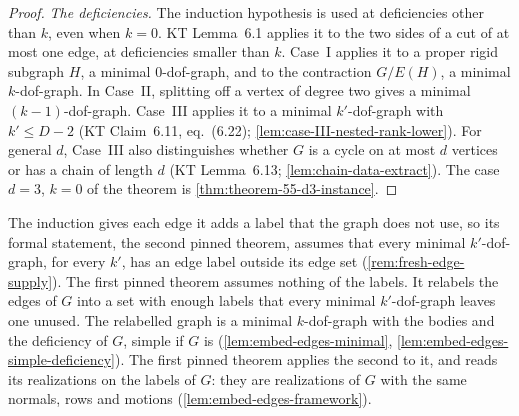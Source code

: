\begin{proof}
  \emph{The deficiencies.} The induction hypothesis is used at
  deficiencies other than $k$, even when $k = 0$. KT Lemma~6.1 applies
  it to the two sides of a cut of at most one edge, at deficiencies
  smaller than $k$. Case~I applies it to a proper rigid subgraph $H$, a
  minimal $0$-dof-graph, and to the contraction $G/E(H)$, a minimal
  $k$-dof-graph. In Case~II, splitting off a vertex of degree two gives a
  minimal $(k-1)$-dof-graph. Case~III applies it to a minimal
  $k'$-dof-graph with $k' \le D - 2$ (KT Claim~6.11, eq.~(6.22);
  \cref{lem:case-III-nested-rank-lower}). For general $d$, Case~III also
  distinguishes whether $G$ is a cycle on at most $d$ vertices or has a
  chain of length $d$ (KT Lemma~6.13; \cref{lem:chain-data-extract}). The
  case $d = 3$, $k = 0$ of the theorem is
  \cref{thm:theorem-55-d3-instance}.
\end{proof}

\begin{fmlnote}
  The induction gives each edge it adds a label that the graph does not
  use, so its formal statement, the second pinned theorem, assumes that
  every minimal $k'$-dof-graph, for every $k'$, has an edge label
  outside its edge set (\cref{rem:fresh-edge-supply}). The first pinned
  theorem assumes nothing of the labels. It relabels the edges of $G$
  into a set with enough labels that every minimal $k'$-dof-graph leaves
  one unused. The relabelled graph is a minimal $k$-dof-graph with the
  bodies and the deficiency of $G$, simple if $G$ is
  (\cref{lem:embed-edges-minimal},
  \cref{lem:embed-edges-simple-deficiency}). The first pinned theorem
  applies the second to it, and reads its realizations on the labels of
  $G$: they are realizations of $G$ with the same normals, rows and
  motions (\cref{lem:embed-edges-framework}).
\end{fmlnote}


